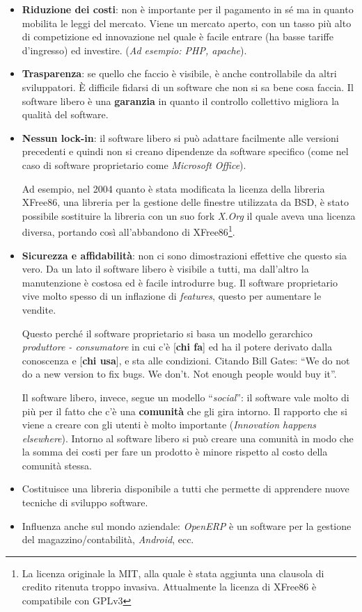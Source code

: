 \begin{itemize}
	\item \textbf{Riduzione dei costi}: non è importante per il pagamento in sé ma in quanto mobilita le leggi del mercato. Viene un mercato aperto, con un tasso più alto di competizione ed innovazione nel quale è facile entrare (ha basse tariffe d'ingresso) ed investire. (\textit{Ad esempio: PHP, apache}).
	\item \textbf{Trasparenza}: se quello che faccio è visibile, è anche controllabile da altri sviluppatori. È difficile fidarsi di un software che non si sa bene cosa faccia. Il software libero è una \textbf{garanzia} in quanto il controllo collettivo migliora la qualità del software.
	
	\item \textbf{Nessun lock-in}: il software libero si può adattare facilmente alle versioni precedenti e quindi non si creano dipendenze da software specifico (come nel caso di software proprietario come \textit{Microsoft Office}).
	
	Ad esempio, nel 2004 quanto è stata modificata la licenza della libreria XFree86, una libreria per la gestione delle finestre utilizzata da BSD, è stato possibile sostituire la libreria con un suo fork \textit{X.Org} il quale aveva una licenza diversa, portando così all'abbandono di XFree86\footnote{La licenza originale la MIT, alla quale è stata aggiunta una clausola di credito ritenuta troppo invasiva. Attualmente la licenza di XFree86 è compatibile con GPLv3}. 
	
	\item \textbf{Sicurezza e affidabilità}: non ci sono dimostrazioni effettive che questo sia vero. Da un lato il software libero è visibile a tutti, ma dall'altro la manutenzione è costosa ed è facile introdurre bug. Il software proprietario vive molto spesso di un inflazione di \textit{features}, questo per aumentare le vendite.
	
	Questo perché il software proprietario si basa un modello gerarchico \textit{produttore - consumatore} in cui c'è [\textbf{chi fa}] ed ha il potere derivato dalla conoscenza e [\textbf{chi usa}], e sta alle condizioni. Citando Bill Gates: ``We do not do a new version to fix bugs. We don't. Not enough people would buy it''. 
	
	Il software libero, invece, segue un modello ``\textit{social}'': il software vale molto di più per il fatto che c'è una \textbf{comunità} che gli gira intorno. Il rapporto che si viene a creare con gli utenti è molto importante (\textit{Innovation happens elsewhere}). Intorno al software libero si può creare una comunità in modo che la somma dei costi per fare un prodotto è minore rispetto al costo della comunità stessa.
	
	\item Costituisce una libreria disponibile a tutti che permette di apprendere nuove tecniche di sviluppo software.
	
	\item Influenza anche sul mondo aziendale: \textit{OpenERP} è un software per la gestione del magazzino/contabilità, \textit{Android}, ecc.
\end{itemize}

